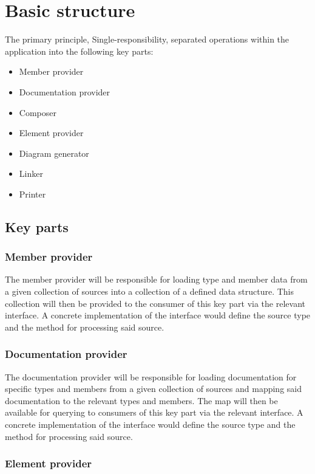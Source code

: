 \chapter{Basic structure}

The primary principle, Single-responsibility, separated operations within the application into the following key parts:
\begin{itemize}
    \item Member provider
    \item Documentation provider
    \item Composer
    \item Element provider
    \item Diagram generator
    \item Linker
    \item Printer
\end{itemize}

\section{Key parts} \label{sec:keyParts}

\subsection{Member provider}

The member provider will be responsible for loading type and member data from a given collection of sources into a collection of a defined data structure.
This collection will then be provided to the consumer of this key part via the relevant interface.
A concrete implementation of the interface would define the source type and the method for processing said source.

\subsection{Documentation provider}

The documentation provider will be responsible for loading documentation for specific types and members from a given collection of sources and mapping said documentation to the relevant types and members.
The map will then be available for querying to consumers of this key part via the relevant interface.
A concrete implementation of the interface would define the source type and the method for processing said source.

\subsection{Element provider}

